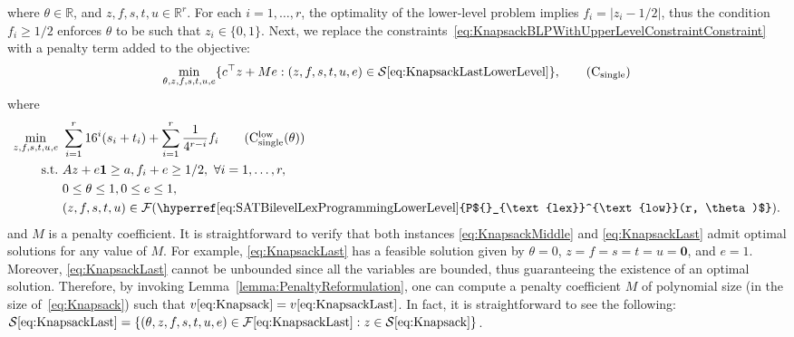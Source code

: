 \documentclass[runningheads,orivec]{llncs}
\newcommand{\MacroColor}[1]{#1}
\newcommand{\ZeroVector}{\mathbf{0}}
\newcommand{\OneVector}{\mathbf{1}}
\newcommand{\IPNVariables}{\MacroColor{r}}
\newcommand{\OptValFunc}{\MacroColor{v}}
\newcommand{\OptSolSet}{\MacroColor{\mathcal{S}}}
\newcommand{\FeasSolSet}{\MacroColor{\mathcal{F}}}
\newcommand{\ReformZ}{\MacroColor{z}}
\newcommand{\ReformAugFrac}{\MacroColor{f}}
\newcommand{\ReformPen}{\MacroColor{e}}
\newcommand{\LexUVar}{\MacroColor{\theta}}
\newcommand{\LexLVarS}{\MacroColor{s}}
\newcommand{\LexLVarT}{\MacroColor{t}}
\newcommand{\LexLVarU}{\MacroColor{u}}
\newcommand{\LexWeightValue}{\MacroColor{16}}
\begin{document}
where $\LexUVar \in \mathbb{R}$, and $\ReformZ, \ReformAugFrac, \LexLVarS, \LexLVarT, \LexLVarU \in \mathbb{R}^{\IPNVariables}$.  
For each $i = 1, \ldots, \IPNVariables$, the optimality of the lower-level problem implies $\ReformAugFrac_i = |\ReformZ_i - 1/2|$, thus the condition $\ReformAugFrac_i \geq 1/2$ enforces $\LexUVar$ to be such that $\ReformZ_i \in \{0,1\}$.  
Next, we replace the constraints~\eqref{eq:KnapsackBLPWithUpperLevelConstraintConstraint} with a penalty term added to the objective:
\begin{align}
\min_{\LexUVar, \ReformZ, \ReformAugFrac, \LexLVarS, \LexLVarT, \LexLVarU, \ReformPen}
\{
c^{\top} \ReformZ + M \ReformPen 
:
(\ReformZ, \ReformAugFrac, \LexLVarS, \LexLVarT, \LexLVarU, \ReformPen) \in 
\OptSolSet\eqref{eq:KnapsackLastLowerLevel}
\},
\tag{C$_{\mathrm{single}}$}
\label{eq:KnapsackLast}
\end{align}
where
\begin{align}
\min_{\ReformZ, \ReformAugFrac, \LexLVarS, \LexLVarT, \LexLVarU, \ReformPen} \ & 
\sum_{i = 1}^{\IPNVariables}
\LexWeightValue^i (\LexLVarS_i + \LexLVarT_i)
+ 
\sum_{i = 1}^{\IPNVariables} \frac{1}{4^{\IPNVariables - i}} \ReformAugFrac_i
\tag{C${}_{\text{single}}^{\text{low}}(\LexUVar)$}
\label{eq:KnapsackLastLowerLevel}
\\
\text{s.t.} \
&
A \ReformZ + \ReformPen \OneVector \ge a, \ReformAugFrac_{i} + \ReformPen \ge 1/2, \ \forall i = 1, \ldots, \IPNVariables, 
\notag
\\
&
0 \le \LexUVar \le 1, 
0 \le \ReformPen \le 1,
\notag \\
&
(\ReformZ, \ReformAugFrac, \LexLVarS, \LexLVarT, \LexLVarU)
\in
\FeasSolSet(\text{\hyperref[eq:SATBilevelLexProgrammingLowerLevel]{P${}_{\text{lex}}^{\text{low}}(\IPNVariables, \LexUVar)$}}).
\notag 
\end{align}
and $M$ is a penalty coefficient.  
It is straightforward to verify that both instances \eqref{eq:KnapsackMiddle} and \eqref{eq:KnapsackLast} admit optimal solutions for any value of $M$.  
For example, \eqref{eq:KnapsackLast} has a feasible solution given by $\LexUVar = 0$, $\ReformZ = \ReformAugFrac = \LexLVarS = \LexLVarT = \LexLVarU = \ZeroVector$, and $\ReformPen = 1$.  
Moreover, \eqref{eq:KnapsackLast} cannot be unbounded since all the variables are bounded, thus guaranteeing the existence of an optimal solution.  
Therefore, by invoking Lemma~\ref{lemma:PenaltyReformulation}, one can compute a penalty coefficient $M$ of polynomial size (in the size of~\eqref{eq:Knapsack}) such that $\OptValFunc\eqref{eq:Knapsack} = \OptValFunc\eqref{eq:KnapsackLast}$.
In fact, it is straightforward to see the following: 
$\OptSolSet\eqref{eq:KnapsackLast} = \{ (\LexUVar, \ReformZ, \ReformAugFrac, \LexLVarS, \LexLVarT, \LexLVarU, \ReformPen) \in \FeasSolSet\eqref{eq:KnapsackLast} : \ReformZ\in \OptSolSet\eqref{eq:Knapsack} \}$.
\end{document}
